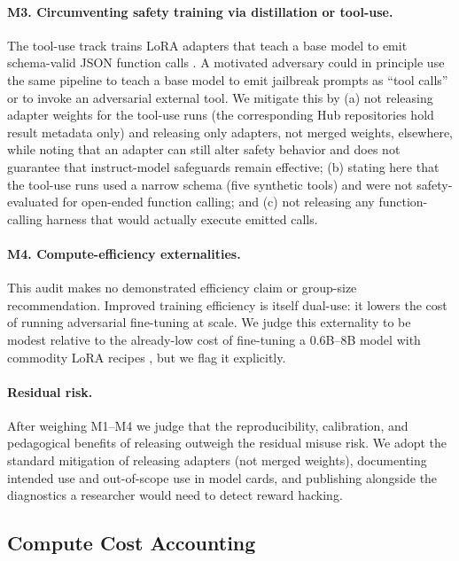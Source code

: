 \paragraph{M3. Circumventing safety training via distillation or tool-use.}
The tool-use track trains LoRA adapters that teach a base model to emit
schema-valid JSON function calls \cite{liu2024xlam}. A motivated adversary
could in principle use the same pipeline to teach a base model to emit
jailbreak prompts as ``tool calls'' or to invoke an adversarial external
tool. We mitigate this by (a) not releasing adapter weights for the tool-use runs
(the corresponding Hub repositories hold result metadata only) and releasing only
adapters, not merged weights, elsewhere,
while noting that an adapter can still alter safety behavior and does not
guarantee that instruct-model safeguards remain effective; (b) stating here that the tool-use runs used a narrow schema (five
synthetic tools) and were not safety-evaluated for open-ended function
calling; and (c) not releasing any function-calling harness that would
actually execute emitted calls.

\paragraph{M4. Compute-efficiency externalities.}
This audit makes no demonstrated efficiency claim or group-size recommendation. Improved training efficiency is
itself dual-use: it lowers the cost of running adversarial fine-tuning at
scale. We judge this externality to be modest relative to the already-low
cost of fine-tuning a 0.6B--8B model with commodity LoRA recipes
\cite{hu2022lora}, but we flag it explicitly.

\paragraph{Residual risk.}
After weighing M1--M4 we judge that the reproducibility, calibration, and
pedagogical benefits of releasing \ours{} outweigh the residual misuse
risk. We adopt the standard mitigation of releasing adapters (not merged
weights), documenting intended use and out-of-scope use in model cards,
and publishing alongside the diagnostics a researcher would need to detect
reward hacking.

\subsection{Compute Cost Accounting}
\label{sec:compute_accounting}

